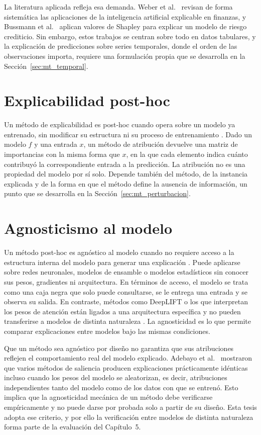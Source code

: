 La literatura aplicada refleja esa demanda. Weber et al.\ \cite{weber2024} revisan de forma sistemática las aplicaciones de la inteligencia artificial explicable en finanzas, y Bussmann et al.\ \cite{bussmann2021} aplican valores de Shapley para explicar un modelo de riesgo crediticio. Sin embargo, estos trabajos se centran sobre todo en datos tabulares, y la explicación de predicciones sobre series temporales, donde el orden de las observaciones importa, requiere una formulación propia que se desarrolla en la Sección~\ref{sec:mt_temporal}.

\section{Explicabilidad post-hoc}
\label{sec:mt_posthoc}

Un método de explicabilidad es post-hoc cuando opera sobre un modelo ya entrenado, sin modificar su estructura ni su proceso de entrenamiento \cite{guidotti2018, arsenault2025}. Dado un modelo $f$ y una entrada $x$, un método de atribución devuelve una matriz de importancias con la misma forma que $x$, en la que cada elemento indica cuánto contribuyó la correspondiente entrada a la predicción. La atribución no es una propiedad del modelo por sí solo. Depende también del método, de la instancia explicada y de la forma en que el método define la ausencia de información, un punto que se desarrolla en la Sección~\ref{sec:mt_perturbacion}.

\section{Agnosticismo al modelo}
\label{sec:mt_agnostico}

Un método post-hoc es agnóstico al modelo cuando no requiere acceso a la estructura interna del modelo para generar una explicación \cite{ribeiro2016, arsenault2025}. Puede aplicarse sobre redes neuronales, modelos de ensamble o modelos estadísticos sin conocer sus pesos, gradientes ni arquitectura. En términos de acceso, el modelo se trata como una caja negra que solo puede consultarse, se le entrega una entrada y se observa su salida. En contraste, métodos como DeepLIFT \cite{shrikumar2017} o los que interpretan los pesos de atención están ligados a una arquitectura específica y no pueden transferirse a modelos de distinta naturaleza \cite{schlegel2019}. La agnosticidad es lo que permite comparar explicaciones entre modelos bajo las mismas condiciones.

Que un método sea agnóstico por diseño no garantiza que sus atribuciones reflejen el comportamiento real del modelo explicado. Adebayo et al.\ \cite{adebayo2018} mostraron que varios métodos de saliencia producen explicaciones prácticamente idénticas incluso cuando los pesos del modelo se aleatorizan, es decir, atribuciones independientes tanto del modelo como de los datos con que se entrenó. Esto implica que la agnosticidad mecánica de un método debe verificarse empíricamente y no puede darse por probada solo a partir de su diseño. Esta tesis adopta ese criterio, y por ello la verificación entre modelos de distinta naturaleza forma parte de la evaluación del Capítulo~5.

